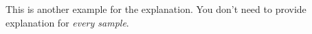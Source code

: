 This is another example for the explanation. You don't need to provide explanation for \emph{every sample}.